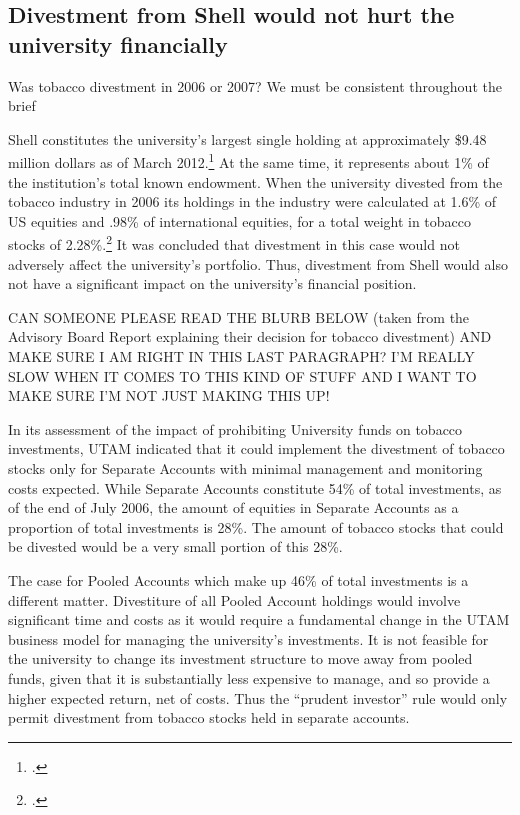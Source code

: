 	\subsection{Divestment from Shell would not hurt the university financially}
	
\begin{vcom}
	Was tobacco divestment in 2006 or 2007? We must be consistent throughout the brief
\end{vcom}

Shell constitutes the university's largest single holding at approximately \$9.48 million dollars as of March 2012.\footcite[][]{UTAM_2012}  
At the same time, it represents about 1\% of the institution's total known endowment. 
When the university divested from the tobacco industry in 2006 its holdings in the industry were calculated at 1.6\% of US equities and .98\% of international equities, for a total weight in tobacco stocks of 2.28\%.\footcite[][]{TobaccoReport_2007}
It was concluded that divestment in this case would not adversely affect the university's portfolio. 
Thus, divestment from Shell would also not have a significant impact on the university's financial position. 



\begin{vcom}
CAN SOMEONE PLEASE READ THE BLURB BELOW (taken from the Advisory Board Report explaining their decision for tobacco divestment) AND MAKE SURE I AM RIGHT IN THIS LAST PARAGRAPH? I’M REALLY SLOW WHEN IT COMES TO THIS KIND OF STUFF AND I WANT TO MAKE SURE I’M NOT JUST MAKING THIS UP!
\end{vcom}



In its assessment of the impact of prohibiting University funds on tobacco investments, UTAM indicated that it could implement the divestment of tobacco stocks only for Separate Accounts with minimal management and monitoring costs expected. 
While Separate Accounts constitute 54\% of total investments, as of the end of July 2006, the amount of equities in Separate Accounts as a proportion of total investments is 28\%. 
The amount of tobacco stocks that could be divested would be a very small portion of this 28\%.



The case for Pooled Accounts which make up 46\% of total investments is a different matter. 
Divestiture of all Pooled Account holdings would involve significant time and costs as it would require a fundamental change in the UTAM business model for managing the university's investments. 
It is not feasible for the university to change its investment structure to move away from pooled funds, given that it is substantially less expensive to manage, and so provide a higher expected return, net of costs. 
Thus the ``prudent investor'' rule would only permit divestment from tobacco stocks held in separate accounts.

